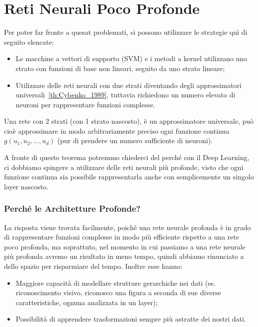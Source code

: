 \section{Reti Neurali Poco Profonde}
Per poter far fronte a quesat problemati, si possono utilizzare le strategie quì di seguito elencate:

\begin{itemize}
    \item Le macchine a vettori di supporto (SVM) e i metodi a kernel utilizzano uno strato con funzioni di base non lineari, seguito da uno strato lineare;
    \item Utilizzare delle reti neurali con due strati diventando degli approssimatori universali~\ref{th:Cybenko_1989}, tuttavia richiedono un numero elevato di neuroni per rappresentare funzioni complesse.
\end{itemize}

\begin{Teorema}
    Una rete con 2 strati (con 1 strato nascosto), è un approssimatore universale, può cioè approssimare in modo arbitrariamente preciso ogni funzione continua $g(u_1,u_2,\dots,u_d)$ (pur di prendere un numero sufficiente di neuroni).
    \label{th:Cybenko_1989}
\end{Teorema}

A fronte di questo teorema potremmo chiederci del perché con il Deep Learning, ci dobbiamo spingere a utilizzare delle reti neurali più profonde, visto che ogni funzione continua sia possibile rappresentarla anche con semplicemente un singolo layer nascosto.

\subsubsection{Perché le Architetture Profonde?}
La risposta viene trovata facilmente, poiché una rete neurale profonda è in grado di rappresentare funzioni complesse in modo più efficiente rispetto a una rete poco profonda, ma soprattuto, nel momento in cui passiamo a una rete neurale più profonda avremo un risultato in meno tempo, quindi abbiamo rinunciato a dello spazio per risparmiare del tempo. Inoltre esse hanno:
\begin{itemize}
    \item Maggiore capacità di modellare strutture gerarchiche nei dati  (es. riconoscimento visivo, riconosco una figura a seconda di sue diverse caratteristiche, ognuna analizzata in un layer);
    \item Possibilità di apprendere trasformazioni sempre più astratte dei nostri dati.
\end{itemize}

